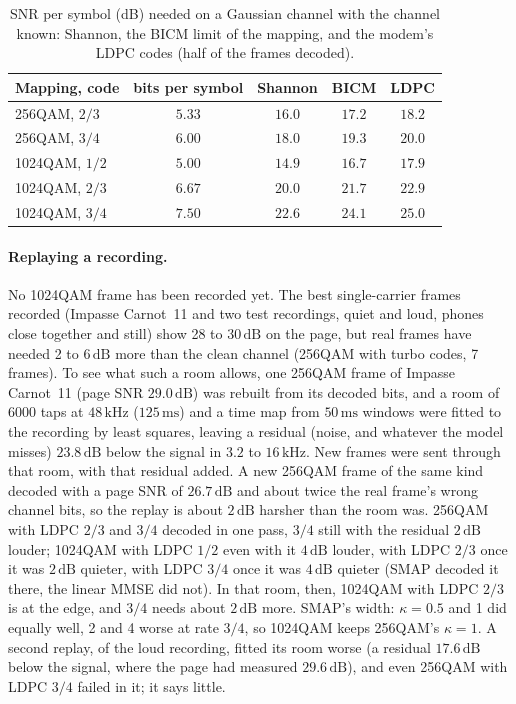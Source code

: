 \documentclass[11pt,a4paper]{article}
\newcommand{\kHz}{\,\mathrm{kHz}}
\newcommand{\ms}{\,\mathrm{ms}}
\newcommand{\dB}{\,\mathrm{dB}}
\theoremstyle{remark}
\begin{document}
\begin{table}[ht]
\centering
\caption{SNR per symbol (dB) needed on a Gaussian channel with the channel known: Shannon, the BICM limit of the mapping, and the modem's LDPC codes (half of the frames decoded).}
\label{tab:q1024}
\small
\begin{tabular}{lcccc}
\toprule
Mapping, code & bits per symbol & Shannon & BICM & LDPC\\
\midrule
256QAM, $2/3$ & $5.33$ & $16.0$ & $17.2$ & $18.2$\\
256QAM, $3/4$ & $6.00$ & $18.0$ & $19.3$ & $20.0$\\
1024QAM, $1/2$ & $5.00$ & $14.9$ & $16.7$ & $17.9$\\
1024QAM, $2/3$ & $6.67$ & $20.0$ & $21.7$ & $22.9$\\
1024QAM, $3/4$ & $7.50$ & $22.6$ & $24.1$ & $25.0$\\
\bottomrule
\end{tabular}
\end{table}

\paragraph{Replaying a recording.}
No 1024QAM frame has been recorded yet. The best single-carrier frames recorded (Impasse Carnot~11 and two test recordings, quiet and loud, phones close together and still) show 28 to $30\dB$ on the page, but real frames have needed 2 to $6\dB$ more than the clean channel (256QAM with turbo codes, 7 frames). To see what such a room allows, one 256QAM frame of Impasse Carnot~11 (page SNR $29.0\dB$) was rebuilt from its decoded bits, and a room of 6000 taps at $48\kHz$ ($125\ms$) and a time map from $50\ms$ windows were fitted to the recording by least squares, leaving a residual (noise, and whatever the model misses) $23.8\dB$ below the signal in $3.2$ to $16\kHz$. New frames were sent through that room, with that residual added. A new 256QAM frame of the same kind decoded with a page SNR of $26.7\dB$ and about twice the real frame's wrong channel bits, so the replay is about $2\dB$ harsher than the room was. 256QAM with LDPC $2/3$ and $3/4$ decoded in one pass, $3/4$ still with the residual $2\dB$ louder; 1024QAM with LDPC $1/2$ even with it $4\dB$ louder, with LDPC $2/3$ once it was $2\dB$ quieter, with LDPC $3/4$ once it was $4\dB$ quieter (SMAP decoded it there, the linear MMSE did not). In that room, then, 1024QAM with LDPC $2/3$ is at the edge, and $3/4$ needs about $2\dB$ more. SMAP's width: $\kappa = 0.5$ and 1 did equally well, 2 and 4 worse at rate $3/4$, so 1024QAM keeps 256QAM's $\kappa = 1$. A second replay, of the loud recording, fitted its room worse (a residual $17.6\dB$ below the signal, where the page had measured $29.6\dB$), and even 256QAM with LDPC $3/4$ failed in it; it says little.
\end{document}
